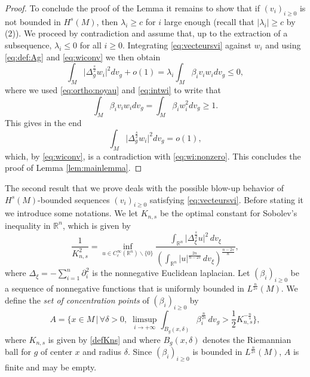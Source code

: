 \documentclass[10pt]{amsart}
\numberwithin{equation}{section}
\newcommand{\R}{\mathbb{R}}
\def\be{{\beta}}
\def\de{{\delta}}
\def\ep{{\varepsilon}}
\def \ep{\epsilon}
\theoremstyle{plain}
\theoremstyle{remark}
\begin{document}
\begin{proof}
To conclude the proof of the Lemma it remains to show that if $(v_i)_{i \ge0}$ is not bounded in $H^s(M)$, then $\lambda_i \geq c$ for $i$ large enough (recall that $\vert \lambda_i \vert \geq c$ by (2)). We proceed by contradiction and assume that, up to the extraction of a subsequence, $\lambda_i  \le 0$ for all $i \ge 0$. Integrating \eqref{eq:vecteursvi} against $w_i$ and using \eqref{eq:def:Ag} and \eqref{eq:wiconv} we then obtain
$$ \int_M \big|\Delta_g^{\frac{s}{2}} w_i \big|^2 dv_g + o(1) =  \lambda_i \int_M \beta_i v_i w_i dv_g \le 0, $$
where we used \eqref{eq:ortho:noyau} and \eqref{eq:intwi} to write that 
$$ \int_M \beta_i v_i w_i dv_g = \int_M \beta_i w_i^2 dv_g \ge 1.$$
This gives in the end 
$$   \int_M \big|\Delta_g^{\frac{s}{2}} w_i \big|^2 dv_g  = o(1), $$
which, by \eqref{eq:wiconv},  is a contradiction with \eqref{eq:wi:nonzero}. This concludes the proof of Lemma \ref{lem:mainlemma}. 
   \end{proof}

The second result that we prove deals with the possible blow-up behavior of $H^s(M)$-bounded sequences $(v_i)_{i \ge0}$ satisfying \eqref{eq:vecteursvi}. Before stating it we introduce some notations. We let $K_{n,s}$ be the optimal constant for Sobolev's inequality in $\R^n$, which is given by 
\begin{equation} \label{defKns}
\frac{1}{K_{n,s}^2} = \inf_{u \in C^\infty_c(\R^n) \backslash \{0\}} \frac{\int_{\R^n} \big| \Delta_{\xi}^{\frac{s}{2}}u \big|^2 \, dv_\xi}{\left( \int_{\R^n} |u|^{\frac{2n}{n-2s}} \, dv_\xi \right)^{\frac{n-2s}{n}}},
\end{equation}
where $\Delta_\xi = - \sum_{i=1}^n \partial_i^2$ is the nonnegative Euclidean laplacian.  Let $(\be_i)_{i \ge0}$ be a sequence of nonnegative functions that is uniformly bounded in $L^{\frac{n}{2s}}(M)$. We define the {\em set of concentration points}  of $(\be_i)_{i \ge 0}$ by 
\begin{equation} \label{conc_points}
A=  \Biggl\{ x \in M \,\Big|\, \forall \de>0, \;  \limsup_{i\to + \infty} \int_{B_g(x,\de)}
  \be_i^{\frac{n}{2s}}  \,dv_g > \frac12 K_{n,s}^{-\frac{n}{s}} \Biggr\},
  \end{equation}
where $K_{n,s}$ is given by \eqref{defKns} and where $B_g(x,\de)$ denotes the Riemannian ball for $g$ of center $x$ and radius $\de$. Since $(\be_i)_{i \ge0}$ is bounded in $L^{\frac{n}{2s}}(M)$, $A$ is finite and may be empty. %

  
 
\end{document}
